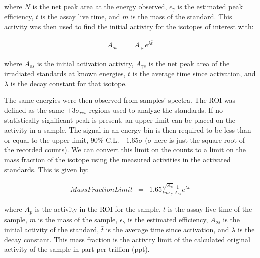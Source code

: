 \noindent where $N$ is the net peak area at the energy observed, $\epsilon_\gamma$ is the estimated peak efficiency, $t$ is the assay live time, and $m$ is the mass of the standard.  This activity was then used to find the initial activity for the isotopes of interest with:

\begin{eqnarray}
A_{os} &=&A_{\gamma s}e^{\lambda \bar{t}}
\end{eqnarray}

\noindent where $A_{os}$ is the initial activation activity, $A_{\gamma s}$ is the net peak area of the irradiated standards at known energies, $\bar{t}$ is the average time since activation, and $\lambda$ is the decay constant for that isotope.  

The same energies were then observed from samples' spectra.  The ROI was defined as the same $\pm$3$\sigma_{res}$ regions used to analyze the standards.  If no statistically significant peak is present, an upper limit can be placed on the activity in a sample.  The signal in an energy bin is then required to be less than or equal to the upper limit, 90\% C.L. - $1.65\sigma$ ($\sigma$ here is just the square root of the recorded counts).  We can convert this limit on the counts to a limit on the mass fraction of the isotope using the measured activities in the activated standards.  This is given by:

\begin{eqnarray}
Mass Fraction Limit&=&1.65 \frac{\sqrt{A_p}}{t  m  \epsilon_\gamma} \frac{1}{A_{os}} e^{\lambda \bar{t}}
\end{eqnarray}

where $A_p$ is the activity in the ROI for the sample, $t$ is the assay live time of the sample, $m$ is the mass of the sample, $\epsilon_\gamma$ is the estimated efficiency, $A_{os}$ is the initial activity of the standard, $\bar{t}$ is the average time since activation, and $\lambda$ is the decay constant.  This mass fraction is the activity limit of the calculated original activity of the sample in part per trillion (ppt).






